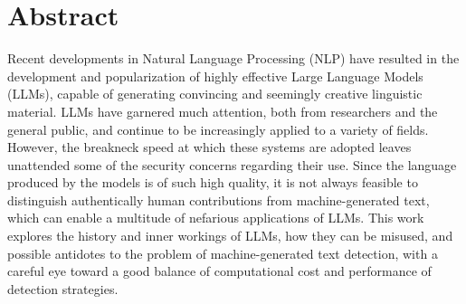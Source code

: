 \section*{Abstract}

Recent developments in Natural Language Processing (NLP) have resulted in the development and popularization of highly effective Large Language Models (LLMs), capable of generating convincing and seemingly creative linguistic material.
LLMs have garnered much attention, both from researchers and the general public, and continue to be increasingly applied to a variety of fields. However, the breakneck speed at which these systems are adopted leaves unattended some of the security concerns regarding their use.
Since the language produced by the models is of such high quality, it is not always feasible to distinguish authentically human contributions from machine-generated text, which can enable a multitude of nefarious applications of LLMs.
This work explores the history and inner workings of LLMs, how they can be misused, and possible antidotes to the problem of machine-generated text detection, with a careful eye toward a good balance of computational cost and performance of detection strategies.
